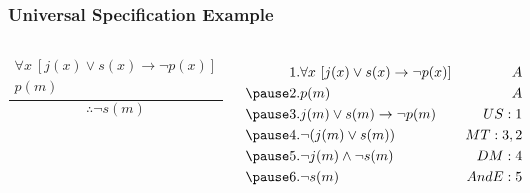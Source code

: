 \documentclass[dvipsnames]{beamer}
\begin{document}
\begin{frame}
  \frametitle{Universal Specification Example}

  \begin{small}
  \begin{example}
    \begin{columns}
      \[
      \frac
        {
          \begin{array}{c}
            \forall x~[j(x) \vee s(x) \rightarrow \neg p(x)]\\
            p(m)
          \end{array}
        }
        {
          \therefore \neg s(m)
        }
      \]

      \pause
      \begin{eqnarray*}
        1. & \forall x~[j(x) \vee s(x) \rightarrow \neg p(x)] & A\\\pause
        2. & p(m)                                             & A\\\pause
        3. & j(m) \vee s(m) \rightarrow \neg p(m)             & US:1\\\pause
        4. & \neg (j(m) \vee s(m))                            & MT:3,2\\\pause
        5. & \neg j(m) \wedge \neg s(m)                       & DM:4\\\pause
        6. & \neg s(m)                                        & AndE:5
      \end{eqnarray*}
    \end{columns}
  \end{example}
  \end{small}
\end{frame}
\end{document}
